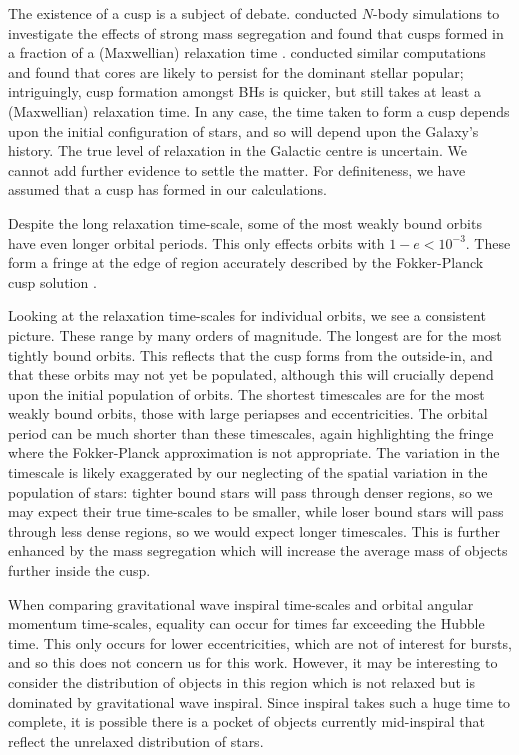 \documentclass[useAMS,usedcolumn,usegraphicx,usenatbib]{mn2e}
\begin{document}
\begin{onecolumn}
The existence of a cusp is a subject of debate. \citet{Preto2010} conducted $N$-body simulations to investigate the effects of strong mass segregation \citep{Alexander2009, Keshet2009} and found that cusps formed in a fraction of a (Maxwellian) relaxation time \citep{Amaro-Seoane2011}. \citet{Gualandris2012} conducted similar computations and found that cores are likely to persist for the dominant stellar popular; intriguingly, cusp formation amongst BHs is quicker, but still takes at least a (Maxwellian) relaxation time. In any case, the time taken to form a cusp depends upon the initial configuration of stars, and so will depend upon the Galaxy's history. The true level of relaxation in the Galactic centre is uncertain. We cannot add further evidence to settle the matter. For definiteness, we have assumed that a cusp has formed in our calculations.

Despite the long relaxation time-scale, some of the most weakly bound orbits have even longer orbital periods. This only effects orbits with $1 - e < 10^{-3}$. These form a fringe at the edge of region accurately described by the Fokker-Planck cusp solution \citep{Spitzer1972}.

Looking at the relaxation time-scales for individual orbits, we see a consistent picture. These range by many orders of magnitude. The longest are for the most tightly bound orbits. This reflects that the cusp forms from the outside-in, and that these orbits may not yet be populated, although this will crucially depend upon the initial population of orbits. The shortest timescales are for the most weakly bound orbits, those with large periapses and eccentricities. The orbital period can be much shorter than these timescales, again highlighting the fringe where the Fokker-Planck approximation is not appropriate. The variation in the timescale is likely exaggerated by our neglecting of the spatial variation in the population of stars: tighter bound stars will pass through denser regions, so we may expect their true time-scales to be smaller, while loser bound stars will pass through less dense regions, so we would expect longer timescales. This is further enhanced by the mass segregation which will increase the average mass of objects further inside the cusp.

When comparing gravitational wave inspiral time-scales and orbital angular momentum time-scales, equality can occur for times far exceeding the Hubble time. This only occurs for lower eccentricities, which are not of interest for bursts, and so this does not concern us for this work. However, it may be interesting to consider the distribution of objects in this region which is not relaxed but is dominated by gravitational wave inspiral. Since inspiral takes such a huge time to complete, it is possible there is a pocket of objects currently mid-inspiral that reflect the unrelaxed distribution of stars.


\end{onecolumn}
\end{document}
